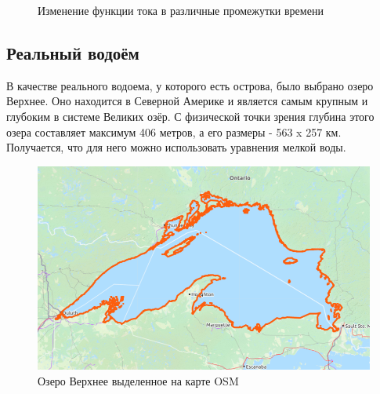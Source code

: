 \documentclass[14pt]{extreport}
\begin{document}
\begin{figure}[H]
  \centering
    \hfill
  \caption{Изменение функции тока в различные промежутки времени}
\end{figure}

\subsection{Реальный водоём}
В качестве реального водоема, у которого есть острова, было выбрано озеро Верхнее. Оно находится в Северной Америке и является самым крупным и глубоким в системе Великих озёр. С физической точки зрения глубина этого озера составляет максимум 406 метров, а его размеры - 563 x 257 км. Получается, что для него можно использовать уравнения мелкой воды.

\begin{figure}[H]
\centerline{
\includegraphics[width=1.0\linewidth]{images/lake_superior}}
\caption{Озеро Верхнее выделенное на карте OSM}
\label{img:lake:superior}
\end{figure}
\end{document}

